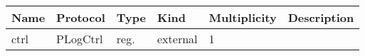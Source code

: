 

\begin{tabular}[ht]{|l|l|l|l|l|p{5cm}|}
\hline
\textbf{Name} & \textbf{Protocol} & \textbf{Type} & \textbf{Kind} & \textbf{Multiplicity} & \textbf{Description}\\
\hline
ctrl & PLogCtrl & reg. & external & 1 & \\
\hline
\end{tabular}


\begin{par}

\end{par}



